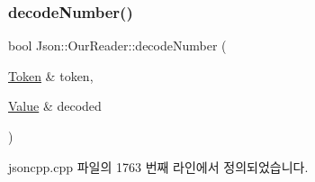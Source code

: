 \subsubsection{\texorpdfstring{decode\+Number()}{decodeNumber()}\hspace{0.1cm}{\footnotesize\ttfamily [2/2]}}
{\footnotesize\ttfamily bool Json\+::\+Our\+Reader\+::decode\+Number (\begin{DoxyParamCaption}\item[{\hyperlink{class_json_1_1_our_reader_1_1_token}{Token} \&}]{token,  }\item[{\hyperlink{class_json_1_1_value}{Value} \&}]{decoded }\end{DoxyParamCaption})\hspace{0.3cm}{\ttfamily [private]}}



jsoncpp.\+cpp 파일의 1763 번째 라인에서 정의되었습니다.


